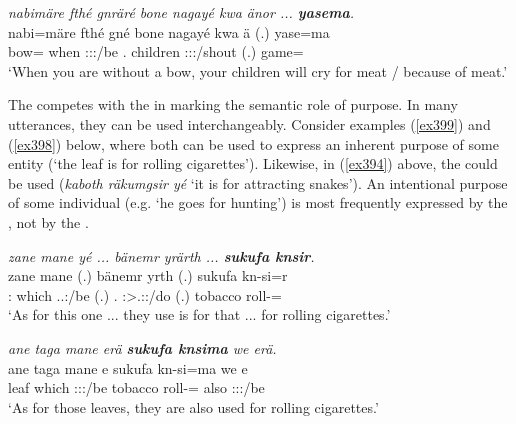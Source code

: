 \begin{exe}
	\ex \emph{nabimäre fthé gnräré bone nagayé kwa änor ... \textbf{yasema}.}\\
	\gll nabi=märe fthé gné bone nagayé kwa ä (.) yase=ma\\
	bow=\Priv{} when \Ssg:\Sbj:\Imp:\Ipfv/be \Ssg.\Poss{} children \Fut{} \Stpl:\Sbj:\Nonpast:\Ipfv/shout{} (.) game=\Char{}\\
	\trans `When you are without a bow, your children will cry for meat / because of meat.'
	\label{ex397}
\end{exe}%

The   competes with the   in marking the semantic role of purpose. In many utterances, they can be used interchangeably. Consider examples (\ref{ex399}) and (\ref{ex398}) below, where both can be used to express an inherent purpose of some entity (`the leaf is for rolling cigarettes'). Likewise, in (\ref{ex394}) above, the  could be used (\emph{kaboth räkumgsir yé} `it is for attracting snakes'). An intentional purpose of some individual (e.g. `he goes for hunting') is most frequently expressed by the  , not by the .

\begin{exe}
	\ex \emph{zane mane yé ... bänemr yrärth ... \textbf{sukufa knsir}.}\\
	\gll zane mane  (.) bänemr yrth (.) sukufa kn-si=r\\
	\Dem:\Prox{} which \Tsg.\Masc.\Nonpast:\Ipfv/be (.) \Recog.\Purp{} \Stpl:\Sbj>\Tsg.\Masc:\Nonpast:\Ipfv/do (.) tobacco roll-\Nmlz=\Purp{}\\
	\trans `As for this one ... they use is for that ... for rolling cigarettes.'\\
	\label{ex399}
\end{exe}
\begin{exe}
	\ex \emph{ane taga mane erä \textbf{sukufa knsima} we erä.}\\
	\gll ane taga mane e sukufa kn-si=ma we e\\
	\Dem{} leaf which \Stpl:\Sbj:\Nonpast:\Ipfv/be tobacco roll-\Nmlz=\Char{} also \Stpl:\Sbj:\Nonpast:\Ipfv/be\\
	\trans `As for those leaves, they are also used for rolling cigarettes.'\\
	\label{ex398}
\end{exe}

